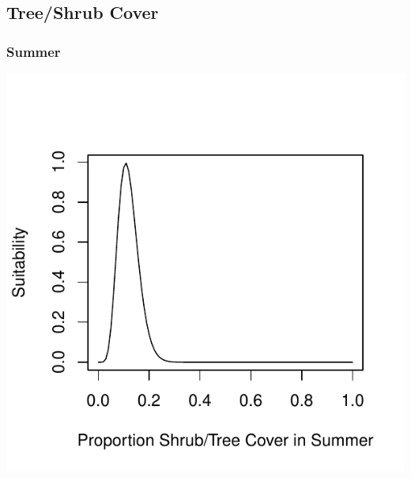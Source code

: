 \documentclass[12pt,letterpaper]{article}\usepackage{graphicx, color}
\makeatletter
\def\maxwidth{ %
  \ifdim\Gin@nat@width>\linewidth
    \linewidth
  \else
    \Gin@nat@width
  \fi
}
\newenvironment{knitrout}{}{} %
\makeatother
\begin{document}
\subsection{Tree/Shrub Cover}
\subsubsection{Summer}
\begin{knitrout}
\color{fgcolor}\includegraphics[width=\maxwidth]{figure/Shrub_Cover_Roy_Summer} 
\end{knitrout}
\end{document}
